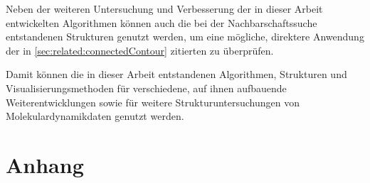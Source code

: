 Neben der weiteren Untersuchung und Verbesserung der in dieser Arbeit entwickelten Algorithmen können auch die bei der Nachbarschaftssuche entstandenen Strukturen genutzt werden, um eine mögliche, direktere Anwendung der in \autoref{sec:related:connectedContour} zitierten  zu überprüfen.

Damit können die in dieser Arbeit entstandenen Algorithmen, Strukturen und Visualisierungsmethoden für verschiedene, auf ihnen aufbauende Weiterentwicklungen sowie für weitere Strukturuntersuchungen von Molekulardynamikdaten genutzt werden.





\appendix

\chapter{Anhang}

